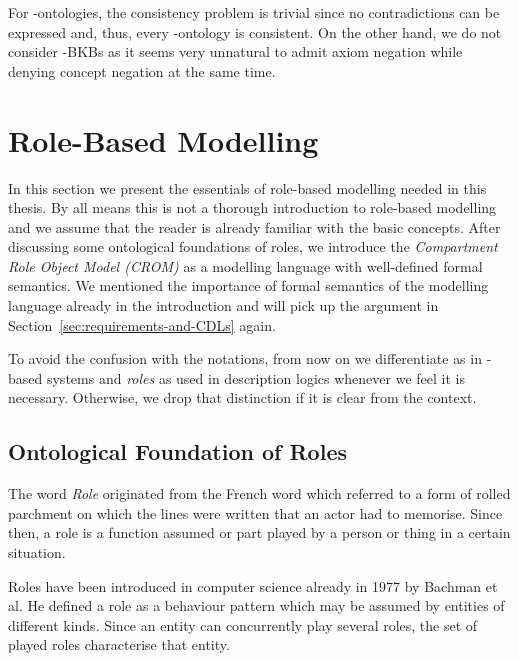 For \EL-ontologies, the consistency problem is trivial since no contradictions can be expressed and,
thus, every \EL-ontology is consistent. On the other hand, we do not consider \EL-BKBs as it seems
very unnatural to admit axiom negation while denying concept negation at the same time.



\section{Role-Based Modelling}
\label{sec:role-based-modelling}

In this section we present the essentials of role-based modelling needed in this thesis. By all
means this is not a thorough introduction to role-based modelling and we assume that the reader is
already familiar with the basic concepts.
%
After discussing some ontological foundations of roles, we introduce the \emph{Compartment Role
  Object Model (CROM)} as a modelling language with well-defined formal semantics. We mentioned the
importance of formal semantics of the modelling language already in the introduction and will pick
up the argument in Section~\ref{sec:requirements-and-CDLs} again.

To avoid the confusion with the notations, from now on we differentiate \emph{\rosiroles} as
in \rosirole-based systems and \emph{roles} as used in description logics whenever we feel it is
necessary. Otherwise, we drop that distinction if it is clear from the context.
%
\subsection{Ontological Foundation of Roles}
\label{sec:rosiroles}

The word \emph{Role} originated from the French word \emph{\Rosirole} which referred to a form of
rolled parchment on which the lines were written that an actor had to memorise.  Since then, a role is a
function assumed or part played by a person or thing in a certain situation.

Roles have been introduced in computer science already in 1977 by Bachman et al. He defined a role
as a behaviour pattern which may be assumed by entities of different kinds. Since an entity can
concurrently play several roles, the set of played roles characterise that entity.

